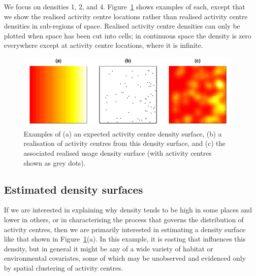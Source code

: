 \documentclass[10pt,a4paper]{article}
\begin{document}
We focus on densities 1, 2, and 4. Figure~\ref{fig:densities} shows examples of each, except that we show the realised activity centre locations rather than realised activity centre densities in sub-regions of space. Realised activity centre densities can only be plotted when space has been cut into cells; in continuous space the density is zero everywhere except at activity centre locations, where it is infinite.

\begin{figure}[htbp]
\centering
\includegraphics[width=\textwidth]{densities.pdf}
\caption{Examples of (a) an expected activity centre density surface, (b) a realisation of activity centres from this density surface, and (c) the associated realised usage density surface (with activity centres shown as grey dots).}
\label{fig:densities}
\end{figure}

\subsection{Estimated density surfaces}

If we are interested in explaining why density tends to be high in some places and lower in others, or in characterising the process that governs the distribution of activity centres, then we are primarily interested in estimating a density surface like that shown in Figure~\ref{fig:densities}(a). In this example, it is easting that influences this density, but in general it might be any of a wide variety of habitat or environmental covariates, some of which may be unobserved and evidenced only by spatial clustering of activity centres. 
\end{document}
